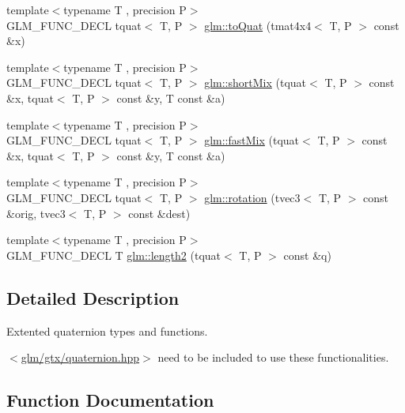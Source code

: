 \begin{DoxyCompactItemize}
\item 
{\footnotesize template$<$typename T , precision P$>$ }\\G\+L\+M\+\_\+\+F\+U\+N\+C\+\_\+\+D\+E\+C\+L tquat$<$ T, P $>$ \hyperlink{group__gtx__quaternion_ga808dd0f83ee8150db7e652313bde8eb2}{glm\+::to\+Quat} (tmat4x4$<$ T, P $>$ const \&x)
\item 
{\footnotesize template$<$typename T , precision P$>$ }\\G\+L\+M\+\_\+\+F\+U\+N\+C\+\_\+\+D\+E\+C\+L tquat$<$ T, P $>$ \hyperlink{group__gtx__quaternion_ga3534443de2a1a806f386976546cddc81}{glm\+::short\+Mix} (tquat$<$ T, P $>$ const \&x, tquat$<$ T, P $>$ const \&y, T const \&a)
\item 
{\footnotesize template$<$typename T , precision P$>$ }\\G\+L\+M\+\_\+\+F\+U\+N\+C\+\_\+\+D\+E\+C\+L tquat$<$ T, P $>$ \hyperlink{group__gtx__quaternion_gac11bf550f17d1da14423595a27575084}{glm\+::fast\+Mix} (tquat$<$ T, P $>$ const \&x, tquat$<$ T, P $>$ const \&y, T const \&a)
\item 
{\footnotesize template$<$typename T , precision P$>$ }\\G\+L\+M\+\_\+\+F\+U\+N\+C\+\_\+\+D\+E\+C\+L tquat$<$ T, P $>$ \hyperlink{group__gtx__quaternion_gac4856d356c5c97cec74e9b672ea89240}{glm\+::rotation} (tvec3$<$ T, P $>$ const \&orig, tvec3$<$ T, P $>$ const \&dest)
\item 
{\footnotesize template$<$typename T , precision P$>$ }\\G\+L\+M\+\_\+\+F\+U\+N\+C\+\_\+\+D\+E\+C\+L T \hyperlink{group__gtx__quaternion_ga02b45352c7ac345cabc9e877314acda6}{glm\+::length2} (tquat$<$ T, P $>$ const \&q)
\end{DoxyCompactItemize}


\subsection{Detailed Description}
Extented quaternion types and functions. 

$<$\hyperlink{gtx_2quaternion_8hpp}{glm/gtx/quaternion.\+hpp}$>$ need to be included to use these functionalities. 

\subsection{Function Documentation}
\hypertarget{group__gtx__quaternion_ga33ecf8ba903eee5fc09f0fbfc0d5ca6b}{}
